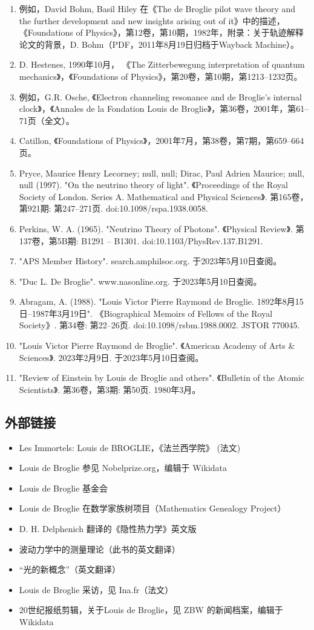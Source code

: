 \begin{enumerate}
\item 例如，David Bohm, Basil Hiley 在《The de Broglie pilot wave theory and the further development and new insights arising out of it》中的描述， 《Foundations of Physics》，第12卷，第10期，1982年，附录：关于轨迹解释论文的背景，D. Bohm（PDF，2011年8月19日归档于Wayback Machine）。
\item D. Hestenes, 1990年10月， 《The Zitterbewegung interpretation of quantum mechanics》，《Foundations of Physics》，第20卷，第10期，第1213–1232页。
\item 例如，G.R. Osche, 《Electron channeling resonance and de Broglie's internal clock》，《Annales de la Fondation Louis de Broglie》，第36卷，2001年，第61–71页（全文）。
\item Catillon, 《Foundations of Physics》，2001年7月，第38卷，第7期，第659–664页。
\item Pryce, Maurice Henry Lecorney; null, null; Dirac, Paul Adrien Maurice; null, null (1997). "On the neutrino theory of light". 《Proceedings of the Royal Society of London. Series A. Mathematical and Physical Sciences》. 第165卷，第921期: 第247–271页. doi:10.1098/rspa.1938.0058.
\item Perkins, W. A. (1965). "Neutrino Theory of Photons". 《Physical Review》. 第137卷，第5B期: B1291 – B1301. doi:10.1103/PhysRev.137.B1291.
\item "APS Member History". search.amphilsoc.org. 于2023年5月10日查阅。
\item "Duc L. De Broglie". www.nasonline.org. 于2023年5月10日查阅。
\item Abragam, A. (1988). "Louis Victor Pierre Raymond de Broglie. 1892年8月15日–1987年3月19日". 《Biographical Memoirs of Fellows of the Royal Society》. 第34卷: 第22–26页. doi:10.1098/rsbm.1988.0002. JSTOR 770045.
\item "Louis Victor Pierre Raymond de Broglie". 《American Academy of Arts & Sciences》. 2023年2月9日. 于2023年5月10日查阅。
\item "Review of Einstein by Louis de Broglie and others". 《Bulletin of the Atomic Scientists》. 第36卷，第3期: 第50页. 1980年3月。
\end{enumerate}
\subsection{外部链接}
\begin{itemize}
\item Les Immortels: Louis de BROGLIE，《法兰西学院》 (法文)
\item Louis de Broglie 参见 Nobelprize.org，编辑于 Wikidata
\item Louis de Broglie 基金会
\item Louis de Broglie 在数学家族树项目（Mathematics Genealogy Project）
\item D. H. Delphenich 翻译的《隐性热力学》英文版
\item 波动力学中的测量理论（此书的英文翻译）
\item “光的新概念”（英文翻译）
\item Louis de Broglie 采访，见 Ina.fr（法文）
\item 20世纪报纸剪辑，关于Louis de Broglie，见 ZBW 的新闻档案，编辑于 Wikidata
\end{itemize}